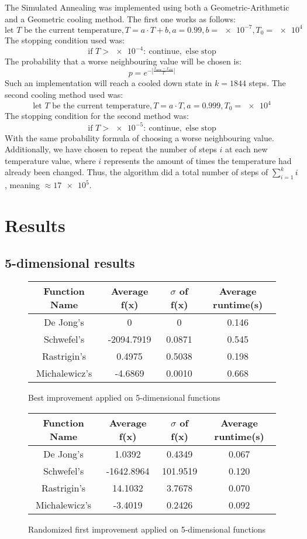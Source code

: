 \documentclass{article}
\newcommand{\euler}{e}
\begin{document}
The Simulated Annealing was implemented using both a Geometric-Arithmetic and a Geometric cooling method. The first one works as follows:
$$ \text{let } T \text{ be the current temperature}, T = a \cdot T + b, a = 0.99, b = \num{e-7}, T_0 = \num{e4} $$
The stopping condition used was:
$$ \text{if } T > \num{e-4}\colon\  \text{continue}, \text{ else stop} $$
The probability that a worse neighbouring value will be chosen is: 
$$p = \euler^{-|\frac{x_{\text{new}} - x_{\text{old}}}{T}|}$$
Such an implementation will reach a cooled down state in $ k = 1844 $ steps.
The second cooling method used was:
$$ \text{let } T \text{ be the current temperature}, T = a \cdot T, a = 0.999, T_0 = \num{e4} $$
The stopping condition for the second method was:
$$ \text{if } T > \num{e-5}\colon\  \text{continue}, \text{ else stop} $$
With the same probability formula of choosing a worse neighbouring value. Additionally, we have chosen to repeat the number of steps $i$ at each new temperature value, where $i$ represents the amount of times the temperature had already been changed. Thus, the algorithm did a total number of steps of $ \sum_{i = 1}^k i $, meaning $\approx \num{17e5} $.   

\section{Results}
\subsection{5-dimensional results}

\begin{figure}[H]
\begin{tabular}{|c||c|c|c|} \hline
	Function Name & Average f(x) & $\sigma$ of f(x) & Average runtime(s) \\ \hline \hline
	De Jong's & 0 & 0 & 0.146 \\ \hline
	Schwefel's & -2094.7919 & 0.0871 & 0.545 \\ \hline
	Rastrigin's & 0.4975 & 0.5038 & 0.198 \\ \hline
	Michalewicz's & -4.6869 & 0.0010 & 0.668 \\ \hline
\end{tabular}
\caption{Best improvement applied on 5-dimensional functions}
\end{figure}

\begin{figure}[H]
\begin{tabular}{|c||c|c|c|} \hline
	Function Name & Average f(x) & $\sigma$ of f(x) & Average runtime(s) \\ \hline \hline
	De Jong's & 1.0392 & 0.4349 & 0.067 \\ \hline
	Schwefel's & -1642.8964 & 101.9519 & 0.120 \\ \hline
	Rastrigin's & 14.1032 & 3.7678 & 0.070 \\ \hline
	Michalewicz's & -3.4019 & 0.2426 & 0.092 \\ \hline
\end{tabular}
\caption{Randomized first improvement applied on 5-dimensional functions}
\end{figure}
\end{document}
